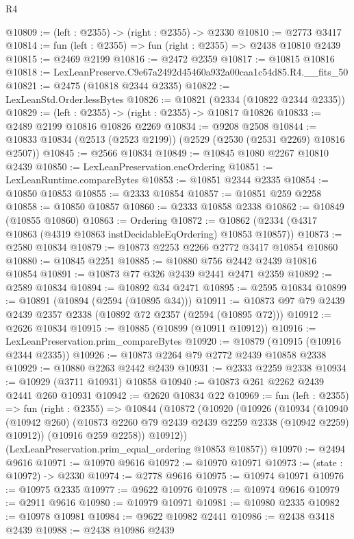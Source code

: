 \begin{lexlean}{R4}
\begin{coremodule}
@10809 := (left : @2355) -> (right : @2355) -> @2330
@10810 := @2773 @3417
@10814 := fun (left : @2355) => fun (right : @2355) => @2438 @10810 @2439
@10815 := @2469 @2199
@10816 := @2472 @2359
@10817 := @10815 @10816
@10818 := LexLeanPreserve.C9e67a2492d45460a932a00caa1c54d85.R4.__fits_50
@10821 := @2475 (@10818 @2344 @2335)
@10822 := LexLeanStd.Order.lessBytes
@10826 := @10821 (@2334 (@10822 @2344 @2335))
@10829 := (left : @2355) -> (right : @2355) -> @10817 @10826
@10833 := @2489 @2199 @10816 @10826 @2269
@10834 := @9208 @2508
@10844 := @10833 @10834 (@2513 (@2523 @2199)) (@2529 (@2530 (@2531 @2269) @10816 @2507))
@10845 := @2566 @10834
@10849 := @10845 @1080 @2267 @10810 @2439
@10850 := LexLeanPreservation.encOrdering
@10851 := LexLeanRuntime.compareBytes
@10853 := @10851 @2344 @2335
@10854 := @10850 @10853
@10855 := @2333 @10854
@10857 := @10851 @259 @2258
@10858 := @10850 @10857
@10860 := @2333 @10858 @2338
@10862 := @10849 (@10855 @10860)
@10863 := Ordering
@10872 := @10862 (@2334 (@4317 @10863 (@4319 @10863 instDecidableEqOrdering) @10853 @10857))
@10873 := @2580 @10834
@10879 := @10873 @2253 @2266 @2772 @3417 @10854 @10860
@10880 := @10845 @2251
@10885 := @10880 @756 @2442 @2439 @10816 @10854
@10891 := @10873 @77 @326 @2439 @2441 @2471 @2359
@10892 := @2589 @10834
@10894 := @10892 @34 @2471
@10895 := @2595 @10834
@10899 := @10891 (@10894 (@2594 (@10895 @34)))
@10911 := @10873 @97 @79 @2439 @2439 @2357 @2338 (@10892 @72 @2357 (@2594 (@10895 @72)))
@10912 := @2626 @10834
@10915 := @10885 (@10899 (@10911 @10912))
@10916 := LexLeanPreservation.prim_compareBytes
@10920 := @10879 (@10915 (@10916 @2344 @2335))
@10926 := @10873 @2264 @79 @2772 @2439 @10858 @2338
@10929 := @10880 @2263 @2442 @2439
@10931 := @2333 @2259 @2338
@10934 := @10929 (@3711 @10931) @10858
@10940 := @10873 @261 @2262 @2439 @2441 @260 @10931
@10942 := @2620 @10834 @22
@10969 := fun (left : @2355) =>
  fun (right : @2355) =>
  @10844
    (@10872
      (@10920
        (@10926
          (@10934
            (@10940 (@10942 @260) (@10873 @2260 @79 @2439 @2439 @2259 @2338 (@10942 @2259) @10912))
            (@10916 @259 @2258))
          @10912))
      (LexLeanPreservation.prim_equal_ordering @10853 @10857))
@10970 := @2494 @9616
@10971 := @10970 @9616
@10972 := @10970 @10971
@10973 := (state : @10972) -> @2330
@10974 := @2778 @9616
@10975 := @10974 @10971
@10976 := @10975 @2335
@10977 := @9622 @10976
@10978 := @10974 @9616
@10979 := @2911 @9616
@10980 := @10979 @10971
@10981 := @10980 @2335
@10982 := @10978 @10981
@10984 := @9622 @10982 @2441
@10986 := @2438 @3418 @2439
@10988 := @2438 @10986 @2439

\end{coremodule}
\end{lexlean}
